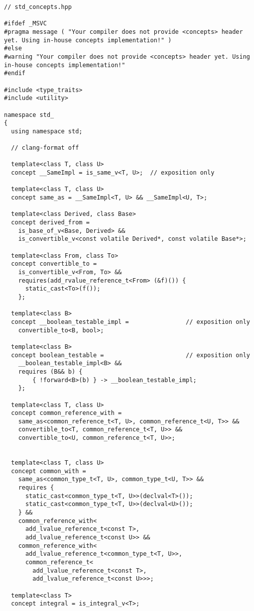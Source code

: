 \begin{verbatim}
// std_concepts.hpp

#ifdef _MSVC
#pragma message ( "Your compiler does not provide <concepts> header yet. Using in-house concepts implementation!" )
#else
#warning "Your compiler does not provide <concepts> header yet. Using in-house concepts implementation!"
#endif

#include <type_traits>
#include <utility>

namespace std_
{
  using namespace std;

  // clang-format off

  template<class T, class U>
  concept __SameImpl = is_same_v<T, U>;  // exposition only
 
  template<class T, class U>
  concept same_as = __SameImpl<T, U> && __SameImpl<U, T>;

  template<class Derived, class Base>
  concept derived_from =
    is_base_of_v<Base, Derived> &&
    is_convertible_v<const volatile Derived*, const volatile Base*>;

  template<class From, class To>
  concept convertible_to =
    is_convertible_v<From, To> &&
    requires(add_rvalue_reference_t<From> (&f)()) {
      static_cast<To>(f());
    };

  template<class B>
  concept __boolean_testable_impl =                // exposition only
    convertible_to<B, bool>;

  template<class B>
  concept boolean_testable =                       // exposition only
    __boolean_testable_impl<B> &&
    requires (B&& b) {
        { !forward<B>(b) } -> __boolean_testable_impl;
    };

  template<class T, class U>
  concept common_reference_with =
    same_as<common_reference_t<T, U>, common_reference_t<U, T>> &&
    convertible_to<T, common_reference_t<T, U>> &&
    convertible_to<U, common_reference_t<T, U>>;


  template<class T, class U>
  concept common_with =
    same_as<common_type_t<T, U>, common_type_t<U, T>> &&
    requires {
      static_cast<common_type_t<T, U>>(declval<T>());
      static_cast<common_type_t<T, U>>(declval<U>());
    } &&
    common_reference_with<
      add_lvalue_reference_t<const T>,
      add_lvalue_reference_t<const U>> &&
    common_reference_with<
      add_lvalue_reference_t<common_type_t<T, U>>,
      common_reference_t<
        add_lvalue_reference_t<const T>,
        add_lvalue_reference_t<const U>>>;

  template<class T>
  concept integral = is_integral_v<T>;


\end{verbatim}

